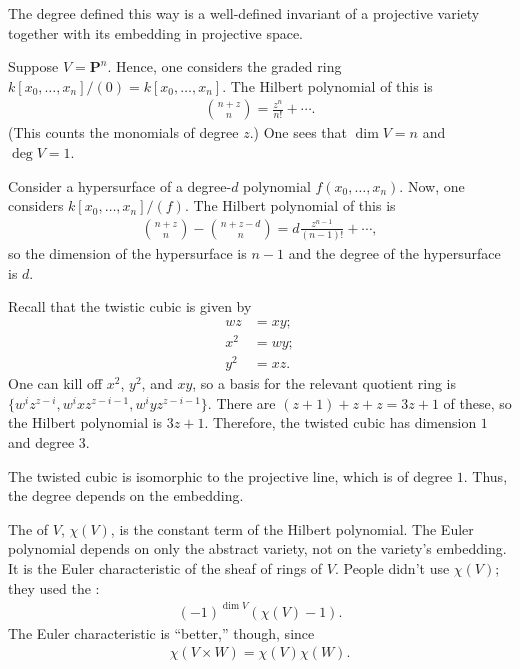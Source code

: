 \documentclass [11 pt, oneside, margin = 1 in] {article}
\begin{document}
\begin{remark}
	The degree defined this way is a well-defined invariant of a projective variety together with its embedding in projective space.
\end{remark}

\begin{example}[ ]\label{}\text{}
Suppose $V=\mathbf{P}^n$. Hence, one considers the graded ring $k[x_0,\hdots,x_n]/(0)=k[x_0,\hdots,x_n]$. The Hilbert polynomial of this is
\begin{align*}
	\binom{n+z}{n} = \frac{z^n}{n!} + \cdots.
\end{align*}
(This counts the monomials of degree $z$.) One sees that $\dim V = n$ and $\deg V = 1$. 
\end{example}

\begin{example}[ ]\label{}\text{}
Consider a hypersurface of a degree-$d$ polynomial $f(x_0,\hdots, x_n)$. Now, one considers $k[x_0,\hdots, x_n]/(f)$. The Hilbert polynomial of this is
\begin{align*}
	\binom{n+z}{n} - \binom{n+z-d}{n}  = d \frac{z^{n-1}}{(n-1)!} + \cdots,
\end{align*}
so the dimension of the hypersurface is $n-1$ and the degree of the hypersurface is $d$.
\end{example}

\begin{example}\label{}\text{}
 Recall that the twistic cubic is given by
\begin{align*}
	wz &= xy;\\
	x^2 &= wy;\\
	y^2 &= xz.
\end{align*}
One can kill off $x^2$, $y^2$, and $xy$, so a basis for the relevant quotient ring is $\{w^iz^{z- i}, w^ixz^{z- i -1}, w^iyz^{z-i-1}\}$. There are $( z+ 1)+z +  z = 3z + 1$ of these, so the Hilbert polynomial is $3z+1$. Therefore, the twisted cubic has dimension $1$ and degree $3$.
\end{example}

\begin{remark}
	The twisted cubic is isomorphic to the projective line, which is of degree $1$. Thus, the degree depends on the embedding.
\end{remark}

The  of $V$, $\chi(V)$, is the constant term of the Hilbert polynomial. The Euler polynomial depends on only the abstract variety, not on the variety's embedding. It is the Euler characteristic of the sheaf of rings of $V$. People didn't use $\chi(V)$; they used the :
\begin{align*}
	(-1)^{\dim V}  (\chi(V)-1).
\end{align*}
The Euler characteristic is ``better,'' though, since
\begin{align*}
	\chi(V\times W) = \chi (V)\chi (W).
\end{align*}
\end{document}
